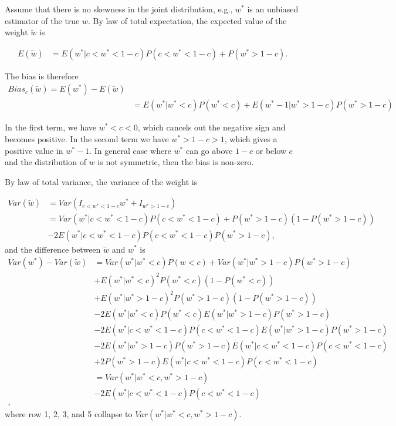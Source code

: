 \documentclass[11pt]{article}
\begin{document}
Assume that there is no skewness in the joint distribution, e.g.,
\(w^*\) is an unbiased estimator of the true \(w\). By law of total expectation, the expected value of
the weight \(\tilde{w}\) is

\begin{equation}
\label{eqn: E w trunc}
\begin{aligned}
E(\tilde{w}) &= E(w^*|c<w^*<1-c)P(c<w^*<1-c) + P(w^*>1-c).
\end{aligned}
\end{equation}

The bias is therefore
\begin{equation}
\label{eqn: bias w trunc}
\begin{aligned}
Bias_c(\tilde{w}) = E(w^*) - E(\tilde{w}) \\
&= E(w^*|w^*<c)P(w^*<c) + E(w^*-1|w^*>1-c)P(w^*>1-c)
\end{aligned}
\end{equation}

In the first term, we have \(w^*<c<0\), which cancels out the negative
sign and becomes positive. In the second term we have \(w^*>1-c>1\), which
gives a positive value in \(w^*-1\). In general case where \(w^*\) can go
above \(1-c\) or below \(c\) and the distribution of \(w\) is not symmetric, then the
bias is non-zero.

By law of total variance, the variance of the weight is

\begin{equation}
\label{eqn: var w trunc}
\begin{aligned}
Var(\tilde{w}) &= Var(I_{c<w^*<1-c}w^*+I_{w^*>1-c})\\
&=Var(w^*|c<w^*<1-c)P(c<w^*<1-c) + P(w^*>1-c)(1-P(w^*>1-c)) \\&- 2E(w^*|c<w^*<1-c)P(c<w^*<1-c)P(w^*>1-c),
\end{aligned}
\end{equation}
and the difference between $\tilde{w}$ and $w^*$ is
\begin{equation}
\label{eqn: delta var w trunc}
\begin{aligned}
Var(w^*) - Var(\tilde{w}) &= Var(w^* | w^*<c)P(w<c)+Var(w^*|w^*>1-c)P(w^*>1-c)\\
&+E(w^*|w^*<c)^2P(w^*<c)(1-P(w^*<c))\\
&+E(w^*|w^*>1-c)^2P(w^*>1-c)(1-P(w^*>1-c))\\
&-2E(w^*|w^*<c)P(w^*<c)E(w^*|w^*>1-c)P(w^*>1-c)\\
&-2E(w^*|c<w^*<1-c)P(c<w^*<1-c)E(w^*|w^*>1-c)P(w^*>1-c)\\
&-2E(w^*|w^*>1-c)P(w^*>1-c)E(w^*|c<w^*<1-c)P(c<w^*<1-c)\\
&+2P(w^*>1-c)E(w^*|c<w^*<1-c)P(c<w^*<1-c)\\
&= Var(w^*|w^*<c, w^*>1-c)\\
&-2E(w^*|c<w^*<1-c)P(c<w^*<1-c)\\[P(w^*>1-c)(E(w^*|w^*>1-c)-1)-E(w^*|w^*<c)P(w^*<c)],
\end{aligned}
\end{equation}
where row 1, 2, 3, and 5 collapse to $Var(w^*|w^*<c, w^*>1-c)$.
\end{document}
